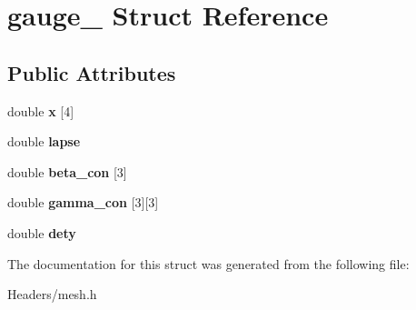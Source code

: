 \hypertarget{structgauge__}{}\section{gauge\+\_\+ Struct Reference}
\label{structgauge__}
\subsection*{Public Attributes}
\begin{DoxyCompactItemize}
\item 
\mbox{\label{structgauge___a71a78ff5b73e2d753d35bb2313629f63}} 
double {\bfseries x} \mbox{[}4\mbox{]}
\item 
\mbox{\label{structgauge___a002b05c269145748b36e156d611cec95}} 
double {\bfseries lapse}
\item 
\mbox{\label{structgauge___aaa15847980f3a29c3c84ba3a3383f12c}} 
double {\bfseries beta\+\_\+con} \mbox{[}3\mbox{]}
\item 
\mbox{\label{structgauge___a8e4efda3ebd4bb99250be4688e3dd5e9}} 
double {\bfseries gamma\+\_\+con} \mbox{[}3\mbox{]}\mbox{[}3\mbox{]}
\item 
\mbox{\label{structgauge___a818ec9b4a798be387fbdf4658ec6bc43}} 
double {\bfseries dety}
\end{DoxyCompactItemize}


The documentation for this struct was generated from the following file\+:\begin{DoxyCompactItemize}
\item 
Headers/mesh.\+h\end{DoxyCompactItemize}
